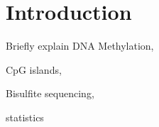 \section{Introduction}

Briefly explain DNA Methylation, 

CpG islands, 

Bisulfite sequencing, 

statistics
  
  
  
  
  
  
  
  